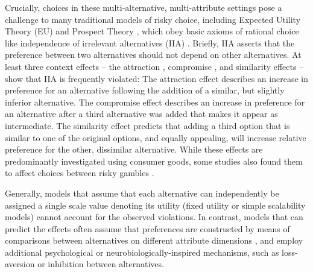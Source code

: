 \documentclass[11pt, a4paper]{article}
\begin{document}
Crucially, choices in these multi-alternative, multi-attribute settings pose a challenge to many traditional models of risky choice, including Expected Utility Theory (EU) \autocite{vonneumann1947TheoryGamesEconomic} and Prospect Theory \autocite{kahneman1979ProspectTheoryAnalysis,tversky1992AdvancesProspectTheory}, which obey basic axioms of rational choice like independence of irrelevant alternatives (IIA) \autocite{luce1959IndividualChoiceBehavior}. Briefly, IIA asserts that the preference between two alternatives should not depend on other alternatives. At least three context effects – the attraction \autocite{huber1982AddingAsymmetricallyDominated}, compromise \autocite{simonson1989ChoiceBasedReasons}, and similarity \autocite{tversky1972EliminationAspectsTheory} effects – show that IIA is frequently violated: The attraction effect describes an increase in preference for an alternative following the addition of a similar, but slightly inferior alternative. The compromise effect describes an increase in preference for an alternative after a third alternative was added that makes it appear as intermediate. The similarity effect predicts that adding a third option that is similar to one of the original options, and equally appealing, will increase relative preference for the other, dissimilar alternative. While these effects are predominantly investigated using consumer goods, some studies also found them to affect choices between risky gambles \autocite{huber1982AddingAsymmetricallyDominated,mohr2017AttractionEffectRisky,soltani2012RangeNormalizationModelContextDependent,tversky1972EliminationAspectsTheory,wedell1991DistinguishingModelsContextually}.

Generally, models that assume that each alternative can independently be assigned a single scale value denoting its utility (fixed utility or simple scalability models\autocite{rieskamp2006ExtendingBoundsRationality}) cannot account for the observed violations. In contrast, models that can predict the effects often assume that preferences are constructed by means of comparisons between alternatives on different attribute dimensions \autocite{roe2001MultialternativeDecisionField,trueblood2014MultiattributeLinearBallistic,tversky1972EliminationAspectsTheory,usher2004LossAversionInhibition,tversky1993ContextDependentPreferences}, and employ additional psychological or neurobiologically-inspired mechanisms, such as loss-aversion or inhibition between alternatives.
\end{document}
